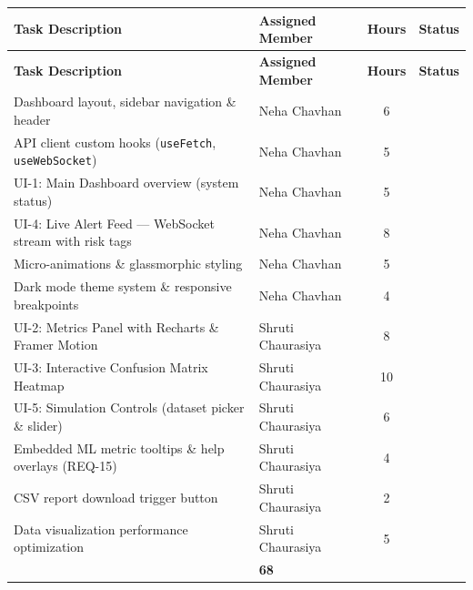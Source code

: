 \documentclass[11pt, a4paper]{article}
\newcommand{\xmark}{\textcolor{danger}{\ding{55}}}
\begin{document}
\noindent
\small
\begin{longtable}{|p{}|p{}|c|c|}
\hline
\rowcolor{primary!10}
\textbf{Task Description} & \textbf{Assigned Member} & \textbf{Hours} & \textbf{Status} \\
\hline
\endfirsthead
\hline
\rowcolor{primary!10}
\textbf{Task Description} & \textbf{Assigned Member} & \textbf{Hours} & \textbf{Status} \\
\hline
\endhead
Dashboard layout, sidebar navigation \& header & Neha Chavhan & 6 & \xmark \\
API client custom hooks (\texttt{useFetch}, \texttt{useWebSocket}) & Neha Chavhan & 5 & \xmark \\
UI-1: Main Dashboard overview (system status) & Neha Chavhan & 5 & \xmark \\
UI-4: Live Alert Feed — WebSocket stream with risk tags & Neha Chavhan & 8 & \xmark \\
Micro-animations \& glassmorphic styling & Neha Chavhan & 5 & \xmark \\
Dark mode theme system \& responsive breakpoints & Neha Chavhan & 4 & \xmark \\
UI-2: Metrics Panel with Recharts \& Framer Motion & Shruti Chaurasiya & 8 & \xmark \\
UI-3: Interactive Confusion Matrix Heatmap & Shruti Chaurasiya & 10 & \xmark \\
UI-5: Simulation Controls (dataset picker \& slider) & Shruti Chaurasiya & 6 & \xmark \\
Embedded ML metric tooltips \& help overlays (REQ-15) & Shruti Chaurasiya & 4 & \xmark \\
CSV report download trigger button & Shruti Chaurasiya & 2 & \xmark \\
Data visualization performance optimization & Shruti Chaurasiya & 5 & \xmark \\
\hline
\rowcolor{lightgray}
\multicolumn{2}{|r|}{\textbf{Phase 3 Total}} & \textbf{68} & \\
\hline
\end{longtable}
\normalsize
\end{document}

